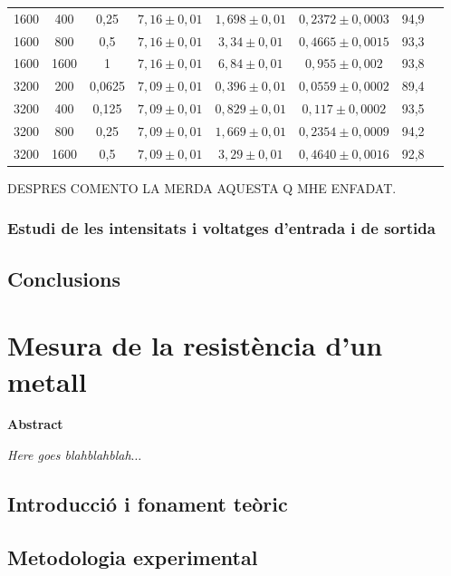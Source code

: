 \documentclass[a4paper,10.5pt]{report}
\newenvironment{chapterabstract}{
	\begin{center}
		\bfseries Abstract
	\end{center}
	\quotation
}{\endquotation}
\begin{document}
\begin{table}[h]
\begin{tabular}{lccccccc}
		1600 & 400 & 0{,}25 & $7{,}16 \pm 0{,}01$ & $1{,}698 \pm 0{,}01$ & $0{,}2372 \pm 0{,}0003$ & 94,9 \\
		1600 & 800 & 0{,}5 & $7{,}16 \pm 0{,}01$ & $3{,}34 \pm 0{,}01$ & $0{,}4665 \pm 0{,}0015$ & 93,3 \\
		1600 & 1600 & 1 & $7{,}16 \pm 0{,}01$ & $6{,}84 \pm 0{,}01$ & $0{,}955 \pm 0{,}002$ & 93,8 \\
		\midrule
		3200 & 200 & 0{,}0625 & $7{,}09 \pm 0{,}01$ & $0{,}396 \pm 0{,}01$ & $0{,}0559 \pm 0{,}0002$ & 89,4 \\
		3200 & 400 & 0{,}125 & $7{,}09 \pm 0{,}01$ & $0{,}829 \pm 0{,}01$ & $0{,}117 \pm 0{,}0002$ & 93,5 \\
		3200 & 800 & 0{,}25 & $7{,}09 \pm 0{,}01$ & $1{,}669 \pm 0{,}01$ & $0{,}2354 \pm 0{,}0009$ & 94,2 \\
		3200 & 1600 & 0{,}5 & $7{,}09 \pm 0{,}01$ & $3{,}29 \pm 0{,}01$ & $0{,}4640 \pm 0{,}0016$ & 92,8 \\
		\bottomrule
	\end{tabular}
	
\end{table}

DESPRES COMENTO LA MERDA AQUESTA Q MHE ENFADAT.

\subsection{Estudi de les intensitats i voltatges d'entrada i de sortida}

\section{Conclusions}

\chapter{Mesura de la resistència d'un metall}

\begin{chapterabstract}
	\textit{Here goes blahblahblah$\ldots$}
\end{chapterabstract}

\section{Introducció i fonament teòric}

\section{Metodologia experimental}
\end{document}
